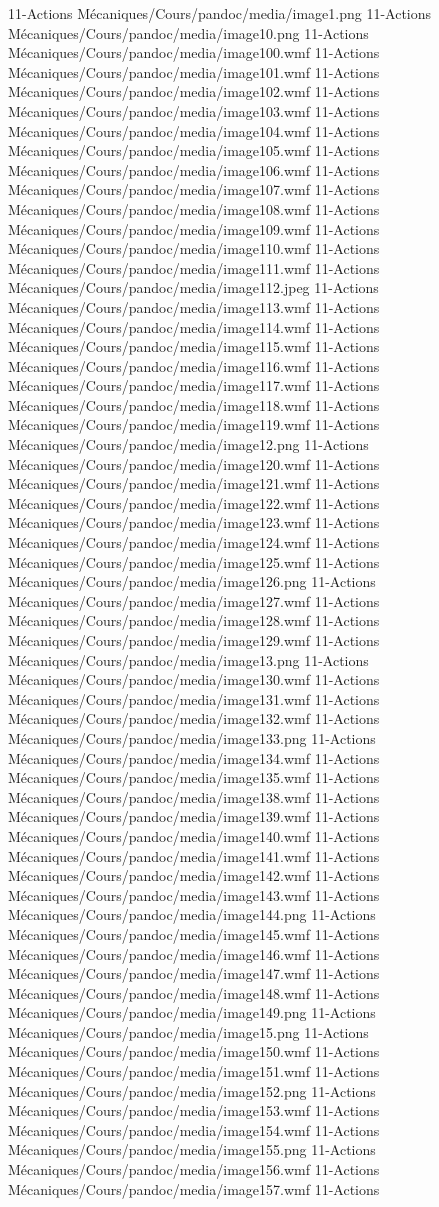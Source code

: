 11-Actions Mécaniques/Cours/pandoc/media/image1.png 11-Actions Mécaniques/Cours/pandoc/media/image10.png 11-Actions Mécaniques/Cours/pandoc/media/image100.wmf 11-Actions Mécaniques/Cours/pandoc/media/image101.wmf 11-Actions Mécaniques/Cours/pandoc/media/image102.wmf 11-Actions Mécaniques/Cours/pandoc/media/image103.wmf 11-Actions Mécaniques/Cours/pandoc/media/image104.wmf 11-Actions Mécaniques/Cours/pandoc/media/image105.wmf 11-Actions Mécaniques/Cours/pandoc/media/image106.wmf 11-Actions Mécaniques/Cours/pandoc/media/image107.wmf 11-Actions Mécaniques/Cours/pandoc/media/image108.wmf 11-Actions Mécaniques/Cours/pandoc/media/image109.wmf 11-Actions Mécaniques/Cours/pandoc/media/image110.wmf 11-Actions Mécaniques/Cours/pandoc/media/image111.wmf 11-Actions Mécaniques/Cours/pandoc/media/image112.jpeg 11-Actions Mécaniques/Cours/pandoc/media/image113.wmf 11-Actions Mécaniques/Cours/pandoc/media/image114.wmf 11-Actions Mécaniques/Cours/pandoc/media/image115.wmf 11-Actions Mécaniques/Cours/pandoc/media/image116.wmf 11-Actions Mécaniques/Cours/pandoc/media/image117.wmf 11-Actions Mécaniques/Cours/pandoc/media/image118.wmf 11-Actions Mécaniques/Cours/pandoc/media/image119.wmf 11-Actions Mécaniques/Cours/pandoc/media/image12.png 11-Actions Mécaniques/Cours/pandoc/media/image120.wmf 11-Actions Mécaniques/Cours/pandoc/media/image121.wmf 11-Actions Mécaniques/Cours/pandoc/media/image122.wmf 11-Actions Mécaniques/Cours/pandoc/media/image123.wmf 11-Actions Mécaniques/Cours/pandoc/media/image124.wmf 11-Actions Mécaniques/Cours/pandoc/media/image125.wmf 11-Actions Mécaniques/Cours/pandoc/media/image126.png 11-Actions Mécaniques/Cours/pandoc/media/image127.wmf 11-Actions Mécaniques/Cours/pandoc/media/image128.wmf 11-Actions Mécaniques/Cours/pandoc/media/image129.wmf 11-Actions Mécaniques/Cours/pandoc/media/image13.png 11-Actions Mécaniques/Cours/pandoc/media/image130.wmf 11-Actions Mécaniques/Cours/pandoc/media/image131.wmf 11-Actions Mécaniques/Cours/pandoc/media/image132.wmf 11-Actions Mécaniques/Cours/pandoc/media/image133.png 11-Actions Mécaniques/Cours/pandoc/media/image134.wmf 11-Actions Mécaniques/Cours/pandoc/media/image135.wmf 11-Actions Mécaniques/Cours/pandoc/media/image138.wmf 11-Actions Mécaniques/Cours/pandoc/media/image139.wmf 11-Actions Mécaniques/Cours/pandoc/media/image140.wmf 11-Actions Mécaniques/Cours/pandoc/media/image141.wmf 11-Actions Mécaniques/Cours/pandoc/media/image142.wmf 11-Actions Mécaniques/Cours/pandoc/media/image143.wmf 11-Actions Mécaniques/Cours/pandoc/media/image144.png 11-Actions Mécaniques/Cours/pandoc/media/image145.wmf 11-Actions Mécaniques/Cours/pandoc/media/image146.wmf 11-Actions Mécaniques/Cours/pandoc/media/image147.wmf 11-Actions Mécaniques/Cours/pandoc/media/image148.wmf 11-Actions Mécaniques/Cours/pandoc/media/image149.png 11-Actions Mécaniques/Cours/pandoc/media/image15.png 11-Actions Mécaniques/Cours/pandoc/media/image150.wmf 11-Actions Mécaniques/Cours/pandoc/media/image151.wmf 11-Actions Mécaniques/Cours/pandoc/media/image152.png 11-Actions Mécaniques/Cours/pandoc/media/image153.wmf 11-Actions Mécaniques/Cours/pandoc/media/image154.wmf 11-Actions Mécaniques/Cours/pandoc/media/image155.png 11-Actions Mécaniques/Cours/pandoc/media/image156.wmf 11-Actions Mécaniques/Cours/pandoc/media/image157.wmf 11-Actions 